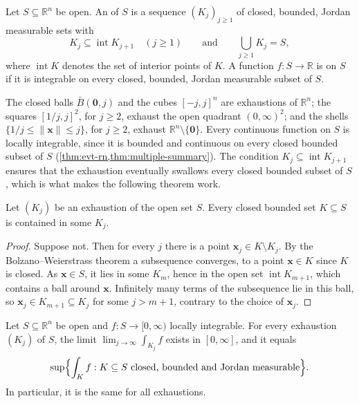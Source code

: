 \begin{definition}
\label{def:exhaustion}
Let $S\subseteq\mathbb R^n$ be open. An  of $S$ is a sequence $(K_j)_{j\ge1}$ of closed, bounded, Jordan measurable sets with
\[
K_j\subseteq\operatorname{int}K_{j+1}\quad(j\ge1)\qquad\text{and}\qquad\bigcup_{j\ge1}K_j=S,
\]
where $\operatorname{int}K$ denotes the set of interior points of $K$. A function $f\colon S\to\mathbb R$ is  on $S$ if it is integrable on every closed, bounded, Jordan measurable subset of $S$.
\end{definition}

The closed balls $\bar B(\mathbf0,j)$ and the cubes $[-j,j]^n$ are exhaustions of $\mathbb R^n$; the squares $[1/j,j]^2$, for $j\ge2$, exhaust the open quadrant $(0,\infty)^2$; and the shells $\{1/j\le\|\mathbf x\|\le j\}$, for $j\ge2$, exhaust $\mathbb R^n\setminus\{\mathbf0\}$. Every continuous function on $S$ is locally integrable, since it is bounded and continuous on every closed bounded subset of $S$ (\cref{thm:evt-rn,thm:multiple-summary}). The condition $K_j\subseteq\operatorname{int}K_{j+1}$ ensures that the exhaustion eventually swallows every closed bounded subset of $S$, which is what makes the following theorem work.

\begin{lemma}
\label{lem:exhaustion-compact}
Let $(K_j)$ be an exhaustion of the open set $S$. Every closed bounded set $K\subseteq S$ is contained in some $K_j$.
\end{lemma}

\begin{proof}
Suppose not. Then for every $j$ there is a point $\mathbf x_j\in K\setminus K_j$. By the Bolzano--Weierstrass theorem a subsequence converges, to a point $\mathbf x\in K$ since $K$ is closed. As $\mathbf x\in S$, it lies in some $K_m$, hence in the open set $\operatorname{int}K_{m+1}$, which contains a ball around $\mathbf x$. Infinitely many terms of the subsequence lie in this ball, so $\mathbf x_j\in K_{m+1}\subseteq K_j$ for some $j>m+1$, contrary to the choice of $\mathbf x_j$.
\end{proof}

\begin{theorem}
\label{thm:exhaustion}
Let $S\subseteq\mathbb R^n$ be open and $f\colon S\to[0,\infty)$ locally integrable. For every exhaustion $(K_j)$ of $S$, the limit $\lim_{j\to\infty}\int_{K_j}f$ exists in $[0,\infty]$, and it equals
\[
\sup\Bigl\{\int_Kf: K\subseteq S\text{ closed, bounded and Jordan measurable}\Bigr\}.
\]
In particular, it is the same for all exhaustions.
\end{theorem}

